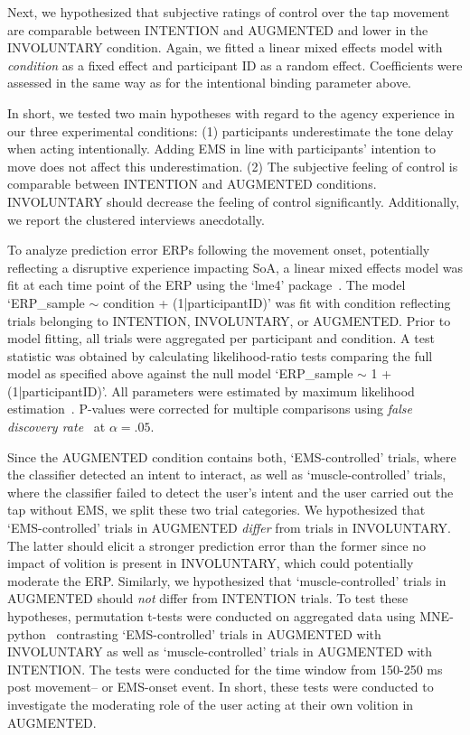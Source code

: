 Next, we hypothesized that subjective ratings of control over the tap movement are comparable between INTENTION and AUGMENTED and lower in the INVOLUNTARY condition. Again, we fitted a linear mixed effects model with \textit{condition} as a fixed effect and participant ID as a random effect. Coefficients were assessed in the same way as for the intentional binding parameter above.

In short, we tested two main hypotheses with regard to the agency experience in our three experimental conditions: (1) participants underestimate the tone delay when acting intentionally. Adding EMS in line with participants' intention to move does not affect this underestimation. (2) The subjective feeling of control is comparable between INTENTION and AUGMENTED conditions. INVOLUNTARY should decrease the feeling of control significantly. Additionally, we report the clustered interviews anecdotally.

To analyze prediction error ERPs following the movement onset, potentially reflecting a disruptive experience impacting SoA, a linear mixed effects model was fit at each time point of the ERP using the `lme4' package~\cite{Bates2015-bh}. The model `ERP\_sample $\sim$ condition + (1|participantID)' was fit with condition reflecting trials belonging to INTENTION, INVOLUNTARY, or AUGMENTED. Prior to model fitting, all trials were aggregated per participant and condition. A test statistic was obtained by calculating likelihood-ratio tests comparing the full model as specified above against the null model `ERP\_sample $\sim$ 1 + (1|participantID)'. All parameters were estimated by maximum likelihood estimation~\cite{Pinheiro2006-bk}. P-values were corrected for multiple comparisons using \textit{false discovery rate}~\cite{Benjamini1995-cw} at $\alpha = .05$.

Since the AUGMENTED condition contains both, `EMS-controlled' trials, where the classifier detected an intent to interact, as well as `muscle-controlled' trials, where the classifier failed to detect the user's intent and the user carried out the tap without EMS, we split these two trial categories. We hypothesized that `EMS-controlled' trials in AUGMENTED \textit{differ} from trials in INVOLUNTARY. The latter should elicit a stronger prediction error than the former since no impact of volition is present in INVOLUNTARY, which could potentially moderate the ERP. Similarly, we hypothesized that `muscle-controlled' trials in AUGMENTED should \textit{not} differ from INTENTION trials. To test these hypotheses, permutation t-tests were conducted on aggregated data using MNE-python~\cite{Gramfort2013-fa} contrasting `EMS-controlled' trials in AUGMENTED with INVOLUNTARY as well as `muscle-controlled' trials in AUGMENTED with INTENTION. The tests were conducted for the time window from 150-250 ms post movement-- or EMS-onset event. In short, these tests were conducted to investigate the moderating role of the user acting at their own volition in AUGMENTED. 

